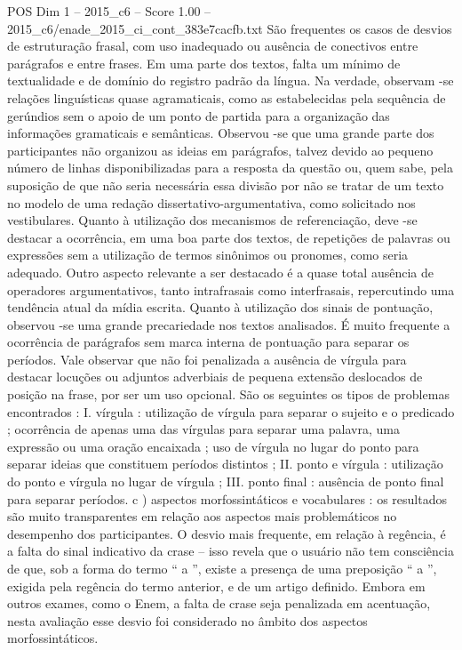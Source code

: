 \begin{textsample}{POS Dim 1 – 2015\_c6 – Score 1.00 – 2015\_c6/enade\_2015\_ci\_cont\_383e7cacfb.txt}
São frequentes os casos de desvios de estruturação frasal, com uso inadequado ou ausência de conectivos entre parágrafos e entre frases.
Em uma parte dos textos, falta um mínimo de textualidade e de domínio do registro padrão da língua.
Na verdade, observam -se relações linguísticas quase agramaticais, como as estabelecidas pela sequência de gerúndios sem o apoio de um ponto de partida para a organização das informações gramaticais e semânticas.
Observou -se que uma grande parte dos participantes não organizou as ideias em parágrafos, talvez devido ao pequeno número de linhas disponibilizadas para a resposta da questão ou, quem sabe, pela suposição de que não seria necessária essa divisão por não se tratar de um texto no modelo de uma redação dissertativo-argumentativa, como solicitado nos vestibulares.
Quanto à utilização dos mecanismos de referenciação, deve -se destacar a ocorrência, em uma boa parte dos textos, de repetições de palavras ou expressões sem a utilização de termos sinônimos ou pronomes, como seria adequado.
Outro aspecto relevante a ser destacado é a quase total ausência de operadores argumentativos, tanto intrafrasais como interfrasais, repercutindo uma tendência atual da mídia escrita.
Quanto à utilização dos sinais de pontuação, observou -se uma grande precariedade nos textos analisados.
É muito frequente a ocorrência de parágrafos sem marca interna de pontuação para separar os períodos.
Vale observar que não foi penalizada a ausência de vírgula para destacar locuções ou adjuntos adverbiais de pequena extensão deslocados de posição na frase, por ser um uso opcional.
São os seguintes os tipos de problemas encontrados : I. vírgula : utilização de vírgula para separar o sujeito e o predicado ; ocorrência de apenas uma das vírgulas para separar uma palavra, uma expressão ou uma oração encaixada ; uso de vírgula no lugar do ponto para separar ideias que constituem períodos distintos ; II. ponto e vírgula : utilização do ponto e vírgula no lugar de vírgula ; III. ponto final : ausência de ponto final para separar períodos. c ) aspectos morfossintáticos e vocabulares : os resultados são muito transparentes em relação aos aspectos mais problemáticos no desempenho dos participantes.
O desvio mais frequente, em relação à regência, é a falta do sinal indicativo da crase – isso revela que o usuário não tem consciência de que, sob a forma do termo “ a ”, existe a presença de uma preposição “ a ”, exigida pela regência do termo anterior, e de um artigo definido.
Embora em outros exames, como o Enem, a falta de crase seja penalizada em acentuação, nesta avaliação esse desvio foi considerado no âmbito dos aspectos morfossintáticos.

\end{textsample}
